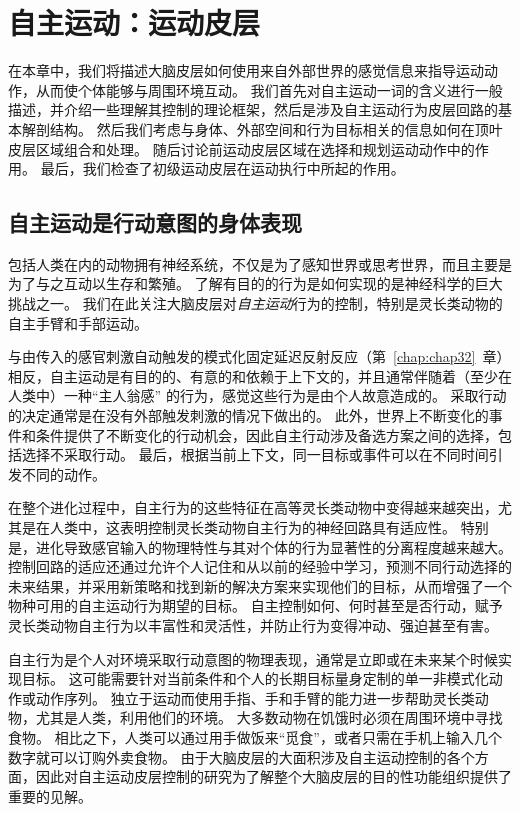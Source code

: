 \chapter{自主运动：运动皮层} \label{chap:chap34}




在本章中，我们将描述大脑皮层如何使用来自外部世界的感觉信息来指导运动动作，从而使个体能够与周围环境互动。
我们首先对自主运动一词的含义进行一般描述，并介绍一些理解其控制的理论框架，然后是涉及自主运动行为皮层回路的基本解剖结构。
然后我们考虑与身体、外部空间和行为目标相关的信息如何在顶叶皮层区域组合和处理。
随后讨论前运动皮层区域在选择和规划运动动作中的作用。
最后，我们检查了初级运动皮层在运动执行中所起的作用。



\section{自主运动是行动意图的身体表现}

包括人类在内的动物拥有神经系统，不仅是为了感知世界或思考世界，而且主要是为了与之互动以生存和繁殖。
了解有目的的行为是如何实现的是神经科学的巨大挑战之一。
我们在此关注大脑皮层对\textit{自主运动}行为的控制，特别是灵长类动物的自主手臂和手部运动。


与由传入的感官刺激自动触发的模式化固定延迟反射反应（第~\ref{chap:chap32}~章）相反，自主运动是有目的的、有意的和依赖于上下文的，并且通常伴随着（至少在人类中）一种“主人翁感” 的行为，感觉这些行为是由个人故意造成的。
采取行动的决定通常是在没有外部触发刺激的情况下做出的。
此外，世界上不断变化的事件和条件提供了不断变化的行动机会，因此自主行动涉及备选方案之间的选择，包括选择不采取行动。
最后，根据当前上下文，同一目标或事件可以在不同时间引发不同的动作。


在整个进化过程中，自主行为的这些特征在高等灵长类动物中变得越来越突出，尤其是在人类中，这表明控制灵长类动物自主行为的神经回路具有适应性。
特别是，进化导致感官输入的物理特性与其对个体的行为显著性的分离程度越来越大。
控制回路的适应还通过允许个人记住和从以前的经验中学习，预测不同行动选择的未来结果，并采用新策略和找到新的解决方案来实现他们的目标，从而增强了一个物种可用的自主运动行为期望的目标。
自主控制如何、何时甚至是否行动，赋予灵长类动物自主行为以丰富性和灵活性，并防止行为变得冲动、强迫甚至有害。


自主行为是个人对环境采取行动意图的物理表现，通常是立即或在未来某个时候实现目标。
这可能需要针对当前条件和个人的长期目标量身定制的单一非模式化动作或动作序列。
独立于运动而使用手指、手和手臂的能力进一步帮助灵长类动物，尤其是人类，利用他们的环境。
大多数动物在饥饿时必须在周围环境中寻找食物。
相比之下，人类可以通过用手做饭来“觅食”，或者只需在手机上输入几个数字就可以订购外卖食物。
由于大脑皮层的大面积涉及自主运动控制的各个方面，因此对自主运动皮层控制的研究为了解整个大脑皮层的目的性功能组织提供了重要的见解。



